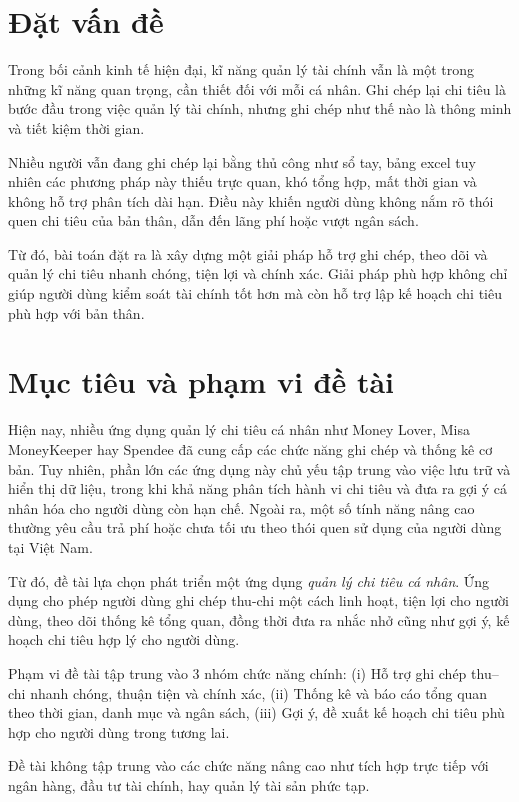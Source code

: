 \documentclass[../DoAn.tex]{subfiles}
\begin{document}
\section{Đặt vấn đề}
\label{section:1.1}

Trong bối cảnh kinh tế hiện đại, kĩ năng quản lý tài chính vẫn là một trong những kĩ năng quan trọng, cần thiết đối với mỗi cá nhân. Ghi chép lại chi tiêu là bước đầu trong việc quản lý tài chính, nhưng ghi chép như thế nào là thông minh và tiết kiệm thời gian.

Nhiều người vẫn đang ghi chép lại bằng thủ công như sổ tay, bảng excel tuy nhiên các phương pháp này thiếu trực quan, khó tổng hợp, mất thời gian và không hỗ trợ phân tích dài hạn. Điều này khiến người dùng không nắm rõ thói quen chi tiêu của bản thân, dẫn đến lãng phí hoặc vượt ngân sách. 

Từ đó, bài toán đặt ra là xây dựng một giải pháp hỗ trợ ghi chép, theo dõi và quản lý chi tiêu nhanh chóng, tiện lợi và chính xác. Giải pháp phù hợp không chỉ giúp người dùng kiểm soát tài chính tốt hơn mà còn hỗ trợ lập kế hoạch chi tiêu phù hợp với bản thân.

\section{Mục tiêu và phạm vi đề tài}
\label{section:1.2}
Hiện nay, nhiều ứng dụng quản lý chi tiêu cá nhân như Money Lover, Misa MoneyKeeper hay Spendee đã cung cấp các chức năng ghi chép và thống kê cơ bản. Tuy nhiên, phần lớn các ứng dụng này chủ yếu tập trung vào việc lưu trữ và hiển thị dữ liệu, trong khi khả năng phân tích hành vi chi tiêu và đưa ra gợi ý cá nhân hóa cho người dùng còn hạn chế. Ngoài ra, một số tính năng nâng cao thường yêu cầu trả phí hoặc chưa tối ưu theo thói quen sử dụng của người dùng tại Việt Nam.

Từ đó, đề tài lựa chọn phát triển một ứng dụng \textit{quản lý chi tiêu cá nhân}. Ứng dụng cho phép người dùng ghi chép thu-chi một cách linh hoạt, tiện lợi cho người dùng, theo dõi thống kê tổng quan, đồng thời đưa ra nhắc nhở cũng như gợi ý, kế hoạch chi tiêu hợp lý cho người dùng.

Phạm vi đề tài tập trung vào 3 nhóm chức năng chính: (i) Hỗ trợ ghi chép thu–chi nhanh chóng, thuận tiện và chính xác, (ii) Thống kê và báo cáo tổng quan theo thời gian, danh mục và ngân sách, (iii) Gợi ý, đề xuất kế hoạch chi tiêu phù hợp cho người dùng trong tương lai.

Đề tài không tập trung vào các chức năng nâng cao như tích hợp trực tiếp với ngân hàng, đầu tư tài chính, hay quản lý tài sản phức tạp.
\end{document}
